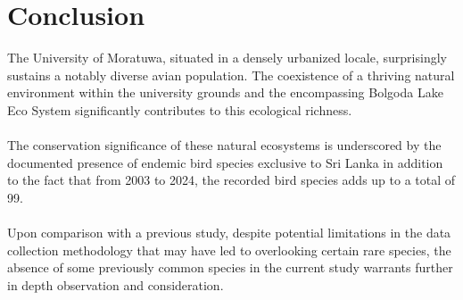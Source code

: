 \chapter{Conclusion}

The University of Moratuwa, situated in a densely urbanized locale, surprisingly sustains a notably diverse avian population. The coexistence of a thriving natural environment within the university grounds and the encompassing Bolgoda Lake Eco System significantly contributes to this ecological richness.
\\\\
The conservation significance of these natural ecosystems is underscored by the documented presence of endemic bird species exclusive to Sri Lanka in addition to the fact that from 2003 to 2024, the recorded bird species adds up to a total of 99.
\\\\
Upon comparison with a previous study, despite potential limitations in the data collection methodology that may have led to overlooking certain rare species, the absence of some previously common species in the current study warrants further in depth observation and consideration. 